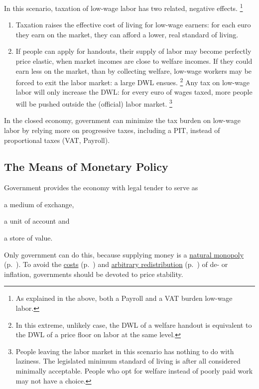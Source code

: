 In this scenario, taxation of low-wage labor has two related, negative effects.
\footnote{
	As explained in the above, both a \gls{Payroll} and a \gls{VAT} burden low-wage labor.
}
\begin{enumerate}
	\item Taxation raises the effective cost of living for low-wage earners:
for each euro they earn on the market, they can afford a lower, real standard of living.
	\item If people can apply for handouts, their supply of labor may become perfectly price elastic, when market incomes are close to welfare incomes.
	If they could earn less on the market, than by collecting welfare, low-wage workers may be forced to exit the labor market:
	a large \gls{DWL} ensues.
	\footnote{
		In this extreme, unlikely case, the \gls{DWL} of a welfare handout is equivalent to the \gls{DWL} of a price floor on labor at the same level.
	}
	Any tax on low-wage labor will only increase the \gls{DWL}:
	for every euro of wages taxed, more people will be pushed outside the (official) labor market.
	\footnote{
		People leaving the labor market in this scenario has nothing to do with laziness.
		The legislated minimum standard of living is after all considered minimally acceptable.
		People who opt for welfare instead of poorly paid work may not have a choice.
	}
\end{enumerate}

In the closed economy, government can minimize the tax burden on low-wage labor by relying more on progressive taxes, including a \gls{PIT}, instead of proportional taxes (\gls{VAT}, \gls{Payroll}).


\subsection[Monetary Policy]{The Means of Monetary Policy} \label{sec:monetary}
Government provides the economy with legal tender to serve as \begin{inparaenum}[1)]
	\item a medium of exchange,
	\item a unit of account and
	\item a store of value.
\end{inparaenum}
Only government can do this, because supplying money is a \hyperref[sec:natural-monopoly]{natural monopoly} (p.~\pageref{sec:natural-monopoly}).
To avoid the \hyperref[sec:price-stability]{costs} (p.~\pageref{sec:price-stability}) and  \hyperref[sec:distributive-effects-of-inflation]{arbitrary redistribution} (p.~\pageref{sec:distributive-effects-of-inflation}) of de- or inflation,
governments should be devoted to price stability.

